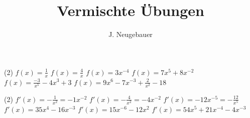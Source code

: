 \documentclass[12pt, a4paper]{scrartcl}
\author{J. Neugebauer}
\title{Vermischte Übungen}
\date{\Heute}
\begin{document}
	\ReiheTitel
	
	\begin{aufgabe}[subtitle=Bilden sie die Ableitung der Funktion]
		\begin{tasks}(2)
			\task $f(x) = \frac{1}{x}$
			\task $f(x) = \frac{4}{x}$
			\task $f(x) = 3x^{-4}$
			\task $f(x) = 7x^5 + 8x^{-2}$
			\task $f(x) = \frac{-3}{x^5} - 4x^3 + 3$
			\task $f(x) = 9x^6 - 7x^{-3} + \frac{2}{x^2} - 18$
		\end{tasks}
	
		\begin{loesung}
			\begin{tasks}(2)
				\task $f'(x) = -\frac{1}{x^2} = -1x^{-2}$
				\task $f'(x) = -\frac{4}{x^2} = -4x^{-2}$
				\task $f'(x) = -12x^{-5} = -\frac{12}{x^5}$
				\task $f'(x) = 35x^4 - 16x^{-3}$
				\task $f'(x) = 15x^{-6} - 12x^2$
				\task $f'(x) = 54x^5 + 21x^{-4} - 4x^{-3}$
			\end{tasks}
		\end{loesung}
	\end{aufgabe}

	\begin{aufgabe}[subtitle=,print=false]
	\end{aufgabe}

	\begin{aufgabe}[subtitle=,print=false]
	\end{aufgabe}

	\begin{aufgabe}[subtitle=,print=false]
	\end{aufgabe}

	\begin{aufgabe}[subtitle=,print=false]
	\end{aufgabe}
\end{document}
